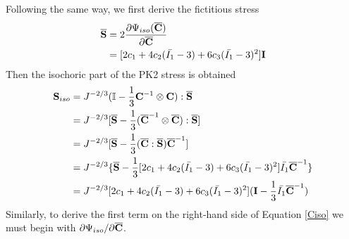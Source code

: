 Following the same way, we first derive the fictitious stress
\begin{equation} \label{Sbar2}
\begin{split}
\overline{\bold{S}} &= 2\frac{\partial\Psi_{iso}({\overline{\bold{C}})}}{\partial\overline{\bold{C}}} \\
&= [2c_1 + 4c_2(\bar{I_1} - 3) + 6c_3(\bar{I_1} - 3)^2] \bold{I} \\
\end{split}
\end{equation}
Then the isochoric part of the PK2 stress is obtained
\begin{equation} \label{Siso2}
\begin{split}
{\bold{S}}_{iso} &= J^{-2/3}(\mathbb{I} - \frac{1}{3}\bold{C}^{-1} \otimes \bold{C}) : \overline{\bold{S}}\\
&= J^{-2/3} [\overline{\bold{S}} - \frac{1}{3}({\overline{\bold{C}}}^{-1} \otimes  {\overline{\bold{C}}}) :  \overline{\bold{S}}] \\
&= J^{-2/3}[\overline{\bold{S}} - \frac{1}{3} (\overline{\bold{C}} : \overline{\bold{S}}) \overline{\bold{C}}^{-1}  ] \\
&= J^{-2/3}\{\overline{\bold{S}} - \frac{1}{3} [2c_1 + 4c_2(\bar{I_1} - 3) + 6c_3(\bar{I_1} - 3)^2] \bar{I_1}\overline{\bold{C}}^{-1} \}\\
&= J^{-2/3}[2c_1 + 4c_2(\bar{I_1} - 3) + 6c_3(\bar{I_1} - 3)^2] (\bold{I} - \frac{1}{3}\bar{I_1}{\overline{\bold{C}}}^{-1})
\end{split}
\end{equation}
Similarly, to derive the first term on the right-hand side of Equation \ref{Ciso} we must begin with $\partial{\Psi_{iso}}/\partial{\overline{\bold{C}}}$.

